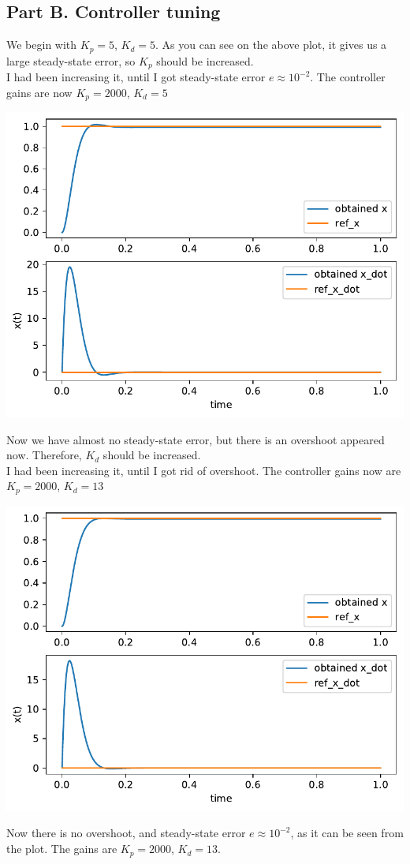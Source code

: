 \documentclass[a4paper,12pt]{article}
\begin{document}
    \subsection*{Part B. Controller tuning}
        We begin with $K_p = 5$, $K_d = 5$. As you can see on the above plot, 
        it gives us a large steady-state error, so $K_p$ should be increased.\\ 
        I had been increasing it, 
        until I got steady-state error $e \approx 10^{-2}$. The controller gains 
        are now $K_p = 2000$, $K_d = 5$
        \begin{center}
            \includegraphics[width = 0.72\linewidth]{2b_1.pdf}
        \end{center}
        Now we have almost no steady-state error, but there is an overshoot appeared
        now. Therefore, $K_d$ should be increased.\\
        I had been increasing it, until I got rid of overshoot. The controller 
        gains now are $K_p = 2000$, $K_d = 13$
        \begin{center}
            \includegraphics[width = 0.77\linewidth]{2b_2.pdf}
        \end{center}
        Now there is no overshoot, and steady-state error $e \approx 10^{-2}$, 
        as it can be seen from the plot. The gains are $K_p = 2000$, $K_d = 13$.
\end{document}
